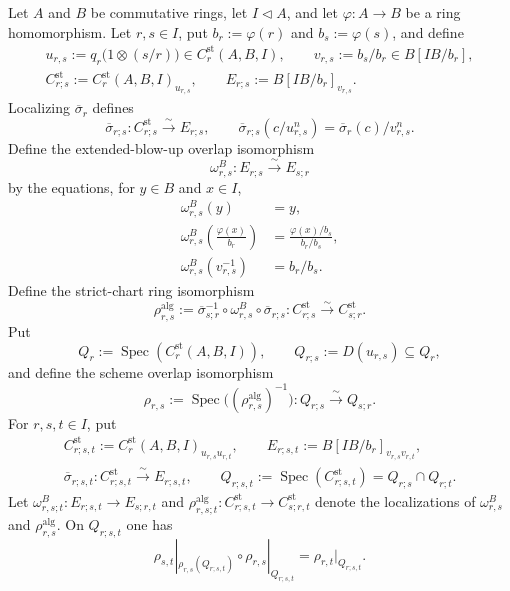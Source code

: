 \begin{lemma}
  \label{lemma:nagata-strict-transform-chart-cocycle}

  Let $A$ and $B$ be commutative rings, let $I\triangleleft A$, and let
  \(\varphi\colon A\to B\) be a ring homomorphism.
  Let $r,s\in I$, put $b_r:=\varphi(r)$ and $b_s:=\varphi(s)$, and define
  \[
  \begin{gathered}
    u_{r,s}:=q_r\bigl(1\otimes(s/r)\bigr)
      \in C_r^{\mathrm{st}}(A,B,I),\qquad
    v_{r,s}:=b_s/b_r\in B[IB/b_r],\\
    C^{\mathrm{st}}_{r;s}:=
      C_r^{\mathrm{st}}(A,B,I)_{u_{r,s}},\qquad
    E_{r;s}:=B[IB/b_r]_{v_{r,s}}.
  \end{gathered}
  \]
  Localizing $\overline\sigma_r$ defines
  \[
    \overline\sigma_{r;s}\colon
      C^{\mathrm{st}}_{r;s}\xrightarrow{\sim}E_{r;s},
    \qquad
    \overline\sigma_{r;s}(c/u_{r,s}^n)
      =\overline\sigma_r(c)/v_{r,s}^n.
  \]
  Define the extended-blow-up overlap isomorphism
  \[
    \omega^B_{r,s}\colon E_{r;s}\xrightarrow{\sim}E_{s;r}
  \]
  by the equations, for $y\in B$ and $x\in I$,
  \[
  \begin{aligned}
    \omega^B_{r,s}(y)&=y,\\
    \omega^B_{r,s}\!\left(\frac{\varphi(x)}{b_r}\right)
      &=\frac{\varphi(x)/b_s}{b_r/b_s},\\
    \omega^B_{r,s}(v_{r,s}^{-1})&=b_r/b_s.
  \end{aligned}
  \]
  Define the strict-chart ring isomorphism
  \[
    \rho^{\mathrm{alg}}_{r,s}:=
      \overline\sigma_{s;r}^{-1}\circ\omega^B_{r,s}
        \circ\overline\sigma_{r;s}
      \colon C^{\mathrm{st}}_{r;s}\xrightarrow{\sim}
        C^{\mathrm{st}}_{s;r}.
  \]
  Put
  \[
    Q_r:=\operatorname{Spec}(C_r^{\mathrm{st}}(A,B,I)),\qquad
    Q_{r;s}:=D(u_{r,s})\subseteq Q_r,
  \]
  and define the scheme overlap isomorphism
  \[
    \rho_{r,s}:=
      \operatorname{Spec}\bigl((\rho^{\mathrm{alg}}_{r,s})^{-1}\bigr)
      \colon Q_{r;s}\xrightarrow{\sim}Q_{s;r}.
  \]
  For $r,s,t\in I$, put
  \[
  \begin{gathered}
    C^{\mathrm{st}}_{r;s,t}:=
      C_r^{\mathrm{st}}(A,B,I)_{u_{r,s}u_{r,t}},\qquad
    E_{r;s,t}:=B[IB/b_r]_{v_{r,s}v_{r,t}},\\
    \overline\sigma_{r;s,t}\colon
      C^{\mathrm{st}}_{r;s,t}\xrightarrow{\sim}E_{r;s,t},\qquad
    Q_{r;s,t}:=\operatorname{Spec}(C^{\mathrm{st}}_{r;s,t})
      =Q_{r;s}\cap Q_{r;t}.
  \end{gathered}
  \]
  Let $\omega^B_{r,s;t}\colon E_{r;s,t}\to E_{s;r,t}$ and
  $\rho^{\mathrm{alg}}_{r,s;t}\colon
    C^{\mathrm{st}}_{r;s,t}\to C^{\mathrm{st}}_{s;r,t}$ denote the
  localizations of $\omega^B_{r,s}$ and $\rho^{\mathrm{alg}}_{r,s}$.
  On $Q_{r;s,t}$ one has
  \[
    \rho_{s,t}|_{\rho_{r,s}(Q_{r;s,t})}\circ
      \rho_{r,s}|_{Q_{r;s,t}}
      =\rho_{r,t}|_{Q_{r;s,t}}.
  \]
\end{lemma}

